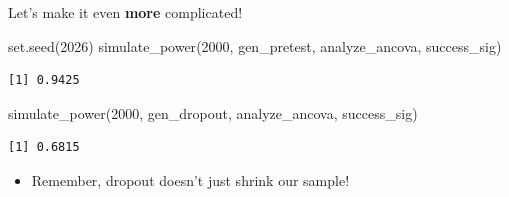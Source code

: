 \documentclass[
  ignorenonframetext,
  aspectratio=169,
]{beamer}
\newenvironment{Shaded}{\begin{snugshade}}{\end{snugshade}}
\newcommand{\DecValTok}[1]{\textcolor[rgb]{0.68,0.00,0.00}{#1}}
\newcommand{\FunctionTok}[1]{\textcolor[rgb]{0.28,0.35,0.67}{#1}}
\newcommand{\NormalTok}[1]{\textcolor[rgb]{0.00,0.23,0.31}{#1}}
\providecommand{\tightlist}{%
  \setlength{\itemsep}{0pt}\setlength{\parskip}{0pt}}\usepackage{longtable,booktabs,array}
\begin{document}
\begin{frame}[fragile]{Let's make it even \textbf{more} complicated!}
\label{lets-make-it-even-more-complicated-2}
\begin{Shaded}
\begin{Highlighting}[]
\FunctionTok{set.seed}\NormalTok{(}\DecValTok{2026}\NormalTok{)}
\FunctionTok{simulate\_power}\NormalTok{(}\DecValTok{2000}\NormalTok{, gen\_pretest, analyze\_ancova, success\_sig)}
\end{Highlighting}
\end{Shaded}

\begin{verbatim}
[1] 0.9425
\end{verbatim}

\begin{Shaded}
\begin{Highlighting}[]
\FunctionTok{simulate\_power}\NormalTok{(}\DecValTok{2000}\NormalTok{, gen\_dropout, analyze\_ancova, success\_sig)}
\end{Highlighting}
\end{Shaded}

\begin{verbatim}
[1] 0.6815
\end{verbatim}

\vskip10pt

\begin{itemize}
\tightlist
\item
  Remember, dropout doesn't just shrink our sample!
\end{itemize}
\end{frame}
\end{document}
